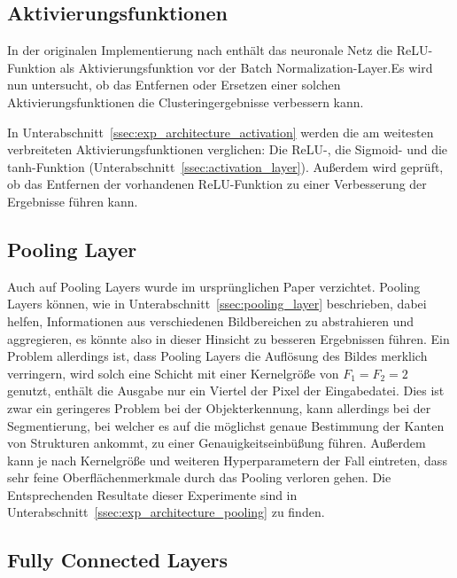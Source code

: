 \subsection{Aktivierungsfunktionen}
\label{ssec:network_architecture_activation}

In der originalen Implementierung nach \cite{kanezaki_18} enthält das neuronale Netz die ReLU-Funktion als Aktivierungsfunktion vor der Batch Normalization-Layer.Es wird nun untersucht, ob das Entfernen oder Ersetzen einer solchen Aktivierungsfunktionen die Clusteringergebnisse verbessern kann.

In Unterabschnitt~\ref{ssec:exp_architecture_activation} werden die am weitesten verbreiteten Aktivierungsfunktionen verglichen: Die ReLU-, die Sigmoid- und die tanh-Funktion (\vgl Unterabschnitt~\ref{ssec:activation_layer}). Außerdem wird geprüft, ob das Entfernen der vorhandenen ReLU-Funktion zu einer Verbesserung der Ergebnisse führen kann.

\subsection{Pooling Layer}
\label{ssec:network_architecture_pooling}

Auch auf Pooling Layers wurde im ursprünglichen Paper verzichtet. Pooling Layers können, wie in Unterabschnitt~\ref{ssec:pooling_layer} beschrieben, dabei helfen, Informationen aus verschiedenen Bildbereichen zu abstrahieren und aggregieren, es könnte also in dieser Hinsicht zu besseren Ergebnissen führen. Ein Problem allerdings ist, dass Pooling Layers die Auflösung des Bildes merklich verringern, wird solch eine Schicht \bspw mit einer Kernelgröße von $F_1=F_2=2$ genutzt, enthält die Ausgabe nur ein Viertel der Pixel der Eingabedatei. Dies ist zwar ein geringeres Problem bei der Objekterkennung, kann allerdings bei der Segmentierung, bei welcher es auf die möglichst genaue Bestimmung der Kanten von Strukturen ankommt, zu einer Genauigkeitseinbüßung führen. Außerdem kann je nach Kernelgröße und weiteren Hyperparametern der Fall eintreten, dass sehr feine Oberflächenmerkmale durch das Pooling verloren gehen. Die Entsprechenden Resultate dieser Experimente sind in Unterabschnitt~\ref{ssec:exp_architecture_pooling} zu finden.

\subsection{Fully Connected Layers}
\label{ssec:network_architecture_fully_connected}

